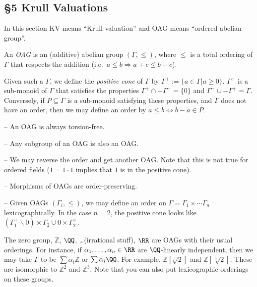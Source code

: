  \subsection{\S 5 Krull Valuations}
 In this section KV means ``Krull valuation'' and OAG means ``ordered abelian group''.

 \begin{definition}
   An \emph{OAG} is an (additive) abelian group $(\Gamma, \le)$, where $\le$ is a total
   ordering of $\Gamma$ that respects the addition (i.e.~$a\le b\Rightarrow a+c\le b+c$).
 \end{definition}
 Given such a $\Gamma$, we define the \emph{positive cone} of $\Gamma$ by
 $\Gamma^+:=\{a\in \Gamma| a\ge 0\}$. $\Gamma^+$ is a sub-monoid of $\Gamma$ that
 satisfies the properties $\Gamma^+\cap -\Gamma^+ = \{0\}$ and $\Gamma^+\cup
 -\Gamma^+=\Gamma$. Conversely, if $P\subseteq \Gamma$ is a sub-monoid satisfying these
 properties, and $\Gamma$ does not have an order, then we may define an order by $a\le b
 \Leftrightarrow b-a\in P$.

 \begin{remark}
 \begin{trivlist}
   \item
   \item -- An OAG is always torsion-free.
   \item -- Any subgroup of an OAG is also an OAG.
   \item -- We may reverse the order and get another OAG. Note that this is not true for
   ordered fields ($1=1\cdot 1$ implies that $1$ is in the positive cone).
   \item -- Morphisms of OAGs are order-preserving.
   \item -- Given OAGs $(\Gamma_i,\le)$, we may define an order on $\Gamma = \Gamma_1\times
   \cdots \Gamma_n$ lexicographically. In the case $n=2$, the positive cone looks like
   $(\Gamma_1^+\smallsetminus 0)\times \Gamma_2 \cup 0\times \Gamma_2^+$.
 \end{trivlist}
 \end{remark}
 \begin{example}
   The zero group, $\mathbb{Z}$, $\QQ$, \dots (irrational stuff), $\RR$ are OAGs with their
   usual orderings. For instance, if $\alpha_1,\dots, \alpha_n\in \RR$ are $\QQ$-linearly
   independent, then we may take $\Gamma$ to be $\sum \alpha_i \mathbb{Z}$ or $\sum \alpha_i
   \QQ$. For example, $\mathbb{Z}[\sqrt 2]$ and $\mathbb{Z}[\sqrt[3] 2]$. These are isomorphic to
   $\mathbb{Z}^2$ and $\mathbb{Z}^3$. Note that you can also put lexicographic orderings on these
   groups.
 \end{example}

